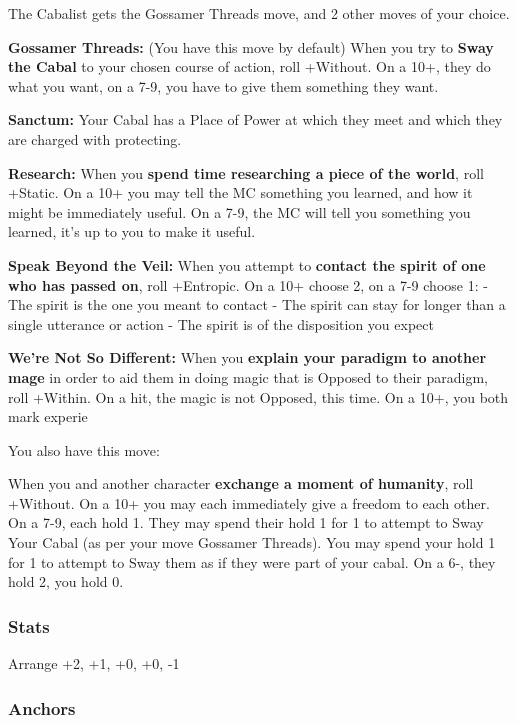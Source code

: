 \documentclass[
]{article}
\begin{document}
The Cabalist gets the Gossamer Threads move, and 2 other moves of your
choice.

\textbf{Gossamer Threads:} (You have this move by default) When you try
to \textbf{Sway the Cabal} to your chosen course of action, roll
+Without. On a 10+, they do what you want, on a 7-9, you have to give
them something they want.

\textbf{Sanctum:} Your Cabal has a Place of Power at which they meet and
which they are charged with protecting.

\textbf{Research:} When you \textbf{spend time researching a piece of
the world}, roll +Static. On a 10+ you may tell the MC something you
learned, and how it might be immediately useful. On a 7-9, the MC will
tell you something you learned, it's up to you to make it useful.

\textbf{Speak Beyond the Veil:} When you attempt to \textbf{contact the
spirit of one who has passed on}, roll +Entropic. On a 10+ choose 2, on
a 7-9 choose 1: - The spirit is the one you meant to contact - The
spirit can stay for longer than a single utterance or action - The
spirit is of the disposition you expect

\textbf{We're Not So Different:} When you \textbf{explain your paradigm
to another mage} in order to aid them in doing magic that is Opposed to
their paradigm, roll +Within. On a hit, the magic is not Opposed, this
time. On a 10+, you both mark experie

You also have this move:

When you and another character \textbf{exchange a moment of humanity},
roll +Without. On a 10+ you may each immediately give a freedom to each
other. On a 7-9, each hold 1. They may spend their hold 1 for 1 to
attempt to Sway Your Cabal (as per your move Gossamer Threads). You may
spend your hold 1 for 1 to attempt to Sway them as if they were part of
your cabal. On a 6-, they hold 2, you hold 0.

\hypertarget{stats-1}{%
\subsubsection{Stats}\label{stats-1}}

Arrange +2, +1, +0, +0, -1

\hypertarget{anchors}{%
\subsubsection{Anchors}\label{anchors}}
\end{document}
